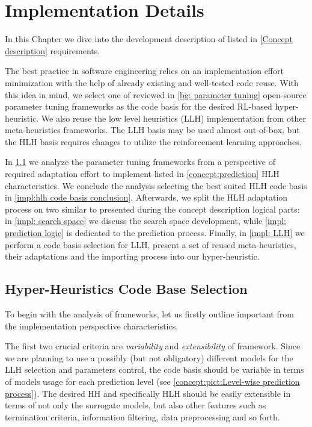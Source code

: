 \chapter{Implementation Details}\label{impl}
In this Chapter we dive into the development description of listed in \cref{Concept description} requirements.
 
The best practice in software engineering relies on an implementation effort minimization with the help of already existing and well-tested code reuse. With this idea in mind, we select one of reviewed in \cref{bg: parameter tuning} open-source parameter tuning frameworks as the code basis for the desired RL-based hyper-heuristic. We also reuse the low level heuristics (LLH) implementation from other meta-heuristics frameworks. The LLH basis may be used almost out-of-box, but the HLH basis requires changes to utilize the reinforcement learning approaches.

In \cref{impl:hlh code basis section} we analyze the parameter tuning frameworks from a perspective of required adaptation effort to implement listed in \cref{concept:prediction} HLH characteristics. We conclude the analysis selecting the best suited HLH code basis in \cref{impl:hlh code basis conclusion}. Afterwards, we split the HLH adaptation process on two similar to presented during the concept description logical parts: in \cref{impl: search space} we discuss the search space development, while \cref{impl: prediction logic} is dedicated to the prediction process. Finally, in \cref{impl: LLH} we perform a code basis selection for LLH, present a set of reused meta-heuristics, their adaptations and the importing process into our hyper-heuristic.


\section{Hyper-Heuristics Code Base Selection}\label{impl:hlh code basis section}
To begin with the analysis of frameworks, let us firstly outline important from the implementation perspective characteristics.

The first two crucial criteria are \emph{variability} and \emph{extensibility} of framework. Since we are planning to use a possibly (but not obligatory) different models for the LLH selection and parameters control, the code basis should be variable in terms of models usage for each prediction level (see \cref{concept:pict:Level-wise prediction process}). The desired HH and specifically HLH should be easily extensible in terms of not only the surrogate models, but also other features such as termination criteria, information filtering, data preprocessing and so forth.

